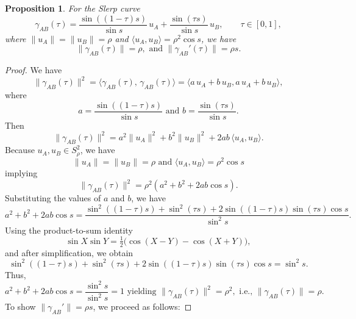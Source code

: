 \documentclass[12pt, reqno]{amsart}
\theoremstyle{plain}
\newtheorem{proposition1}[subsubsection]{Proposition}
\theoremstyle{definition}
\renewcommand{\gg}{\gamma}%
\newcommand{\gt}{\tau}
\newcommand{\te}{\text}%
\newcommand{\la}{\langle}
\newcommand{\ra}{\rangle}
\begin{document}
\begin{proposition1} \label{prop00} 
For the Slerp curve
\[
\gamma_{AB}(\tau)
= \frac{\sin((1-\tau)s)}{\sin s}\,u_A
+ \frac{\sin(\tau s)}{\sin s}\,u_B,
\qquad \tau \in [0,1],
\]
where $\|u_A\|=\|u_B\|=\rho$ and $\langle u_A,u_B\rangle=\rho^2\cos s$,
we have
\[
\|\gamma_{AB}(\tau)\| = \rho, \te{ and } \|\gg_{AB}'(\gt)\|=\rho s.
\]
\end{proposition1} 

\begin{proof}
We have 
\[
\|\gamma_{AB}(\tau)\|^2 = \langle \gamma_{AB}(\tau),\, \gamma_{AB}(\tau) \rangle=\langle a\,u_A + b\,u_B, a\,u_A + b\,u_B\rangle,
\]
where
\[
a = \frac{\sin((1-\tau)s)}{\sin s}  \te{ and } 
b = \frac{\sin(\tau s)}{\sin s}.
\]
Then
\[
\|\gamma_{AB}(\tau)\|^2 
= a^2 \|u_A\|^2 
+ b^2 \|u_B\|^2 
+ 2ab\,\langle u_A, u_B \rangle.
\]
Because $u_A, u_B\in S_\rho^2$, we have 
\[\|u_A\|=\|u_B\|=\rho \te{ and } \la u_A, u_B\ra=\rho^2\cos s\]
implying \[
\|\gamma_{AB}(\tau)\|^2 
= \rho^2(a^2 +b^2+ 2ab\cos s).
\]
Substituting the values of $a$ and $b$, we have 
\[
a^2 + b^2 + 2ab\cos s 
= 
\frac{
\sin^2((1-\tau)s)
+ \sin^2(\tau s)
+ 2\sin((1-\tau)s)\sin(\tau s)\cos s
}{\sin^2 s}.
\]
Using the product-to-sum identity
\[
\sin X \sin Y 
= \tfrac{1}{2}\big(\cos(X-Y) - \cos(X+Y)\big),
\]
and after simplification, we obtain
\[
\sin^2((1-\tau)s)
+ \sin^2(\tau s)
+ 2\sin((1-\tau)s)\sin(\tau s)\cos s
= \sin^2 s.
\]
Thus,
\[
a^2 + b^2 + 2ab\cos s
= \frac{\sin^2 s}{\sin^2 s}
= 1 \te{ yielding } \|\gamma_{AB}(\tau)\|^2
= \rho^2, \te{ i.e., }    \|\gamma_{AB}(\tau)\|=\rho. 
\]
To show $\|\gg_{AB}'\|=\rho s$, we proceed as follows:


\end{proof}
\end{document}
